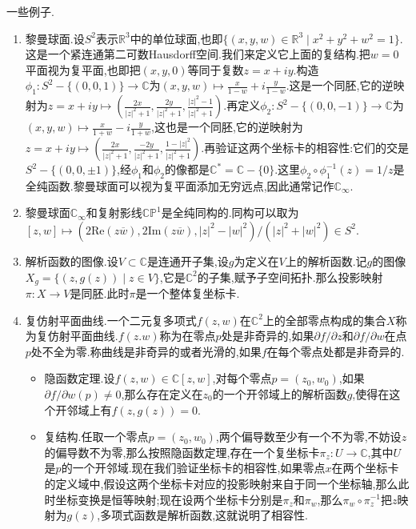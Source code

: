 一些例子.
\begin{enumerate}
	
	
	
	
	\item 黎曼球面.设$S^2$表示$\mathbb{R}^3$中的单位球面,也即$\{(x,y,w)\in\mathbb{R}^3\mid x^2+y^2+w^2=1\}$.这是一个紧连通第二可数Hausdorff空间.我们来定义它上面的复结构.把$w=0$平面视为复平面,也即把$(x,y,0)$等同于复数$z=x+iy$.构造$\phi_1:S^2-\{(0,0,1)\}\to\mathbb{C}$为$(x,y,w)\mapsto\frac{x}{1-w}+i\frac{y}{1-w}$.这是一个同胚,它的逆映射为$z=x+iy\mapsto(\frac{2x}{|z|^2+1},\frac{2y}{|z|^2+1},\frac{|z|^2-1}{|z|^2+1})$.再定义$\phi_2:S^2-\{(0,0,-1)\}\to\mathbb{C}$为$(x,y,w)\mapsto\frac{x}{1+w}-i\frac{y}{1+w}$,这也是一个同胚,它的逆映射为$z=x+iy\mapsto(\frac{2x}{|z|^2+1},\frac{-2y}{|z|^2+1},\frac{1-|z|^2}{|z|^2+1})$.再验证这两个坐标卡的相容性:它们的交是$S^2-\{(0,0,\pm1)\}$,经$\phi_1$和$\phi_2$的像都是$\mathbb{C}^*=\mathbb{C}-\{0\}$.这里$\phi_2\circ\phi_1^{-1}(z)=1/z$是全纯函数.黎曼球面可以视为复平面添加无穷远点,因此通常记作$\mathbb{C}_{\infty}$.
	\item 黎曼球面$\mathbb{C}_{\infty}$和复射影线$\mathbb{CP}^1$是全纯同构的.同构可以取为$[z,w]\mapsto(2\mathrm{Re}(z\overline{w}),2\mathrm{Im}(z\overline{w}),|z|^2-|w|^2)/(|z|^2+|w|^2)\in S^2$.
	\item 解析函数的图像.设$V\subset\mathbb{C}$是连通开子集,设$g$为定义在$V$上的解析函数.记$g$的图像$X_g=\{(z,g(z))\mid z\in V\}$,它是$\mathbb{C}^2$的子集,赋予子空间拓扑.那么投影映射$\pi:X\to V$是同胚.此时$\pi$是一个整体复坐标卡.
	\item 复仿射平面曲线.一个二元复多项式$f(z,w)$在$\mathbb{C}^2$上的全部零点构成的集合$X$称为复仿射平面曲线.$f(z.w)$称为在零点$p$处是非奇异的,如果$\partial f/\partial z$和$\partial f/\partial w$在点$p$处不全为零.称曲线是非奇异的或者光滑的,如果$f$在每个零点处都是非奇异的.
	\begin{itemize}
		\item 隐函数定理.设$f(z,w)\in\mathbb{C}[z,w]$,对每个零点$p=(z_0,w_0)$,如果$\partial f/\partial w(p)\not=0$,那么存在定义在$z_0$的一个开邻域上的解析函数$g$,使得在这个开邻域上有$f(z,g(z))=0$.
		\item 复结构.任取一个零点$p=(z_0,w_0)$,两个偏导数至少有一个不为零,不妨设$z$的偏导数不为零,那么按照隐函数定理,存在一个复坐标卡$\pi_z:U\to\mathbb{C}$,其中$U$是$p$的一个开邻域.现在我们验证坐标卡的相容性,如果零点$x$在两个坐标卡的定义域中,假设这两个坐标卡对应的投影映射来自于同一个坐标轴,那么此时坐标变换是恒等映射;现在设两个坐标卡分别是$\pi_z$和$\pi_w$,那么$\pi_w\circ\pi_z^{-1}$把$z$映射为$g(z)$,多项式函数是解析函数,这就说明了相容性.

\end{itemize}
\end{enumerate}
